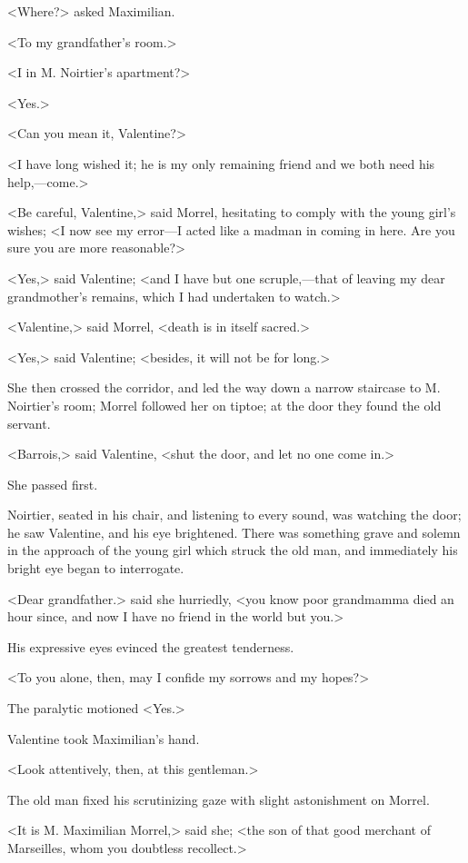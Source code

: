  <Where?> asked Maximilian. 

 <To my grandfather's room.> 

 <I in M. Noirtier's apartment?> 

 <Yes.> 

 <Can you mean it, Valentine?> 

 <I have long wished it; he is my only remaining friend and we both need his help,—come.> 

 <Be careful, Valentine,> said Morrel, hesitating to comply with the young girl's wishes; <I now see my error—I acted like a madman in coming in here. Are you sure you are more reasonable?> 

 <Yes,> said Valentine; <and I have but one scruple,—that of leaving my dear grandmother's remains, which I had undertaken to watch.> 

 <Valentine,> said Morrel, <death is in itself sacred.> 

 <Yes,> said Valentine; <besides, it will not be for long.> 

 She then crossed the corridor, and led the way down a narrow staircase to M. Noirtier's room; Morrel followed her on tiptoe; at the door they found the old servant. 

 <Barrois,> said Valentine, <shut the door, and let no one come in.> 

 She passed first. 

 Noirtier, seated in his chair, and listening to every sound, was watching the door; he saw Valentine, and his eye brightened. There was something grave and solemn in the approach of the young girl which struck the old man, and immediately his bright eye began to interrogate.  
 
 
 <Dear grandfather.> said she hurriedly, <you know poor grandmamma died an hour since, and now I have no friend in the world but you.> 

 His expressive eyes evinced the greatest tenderness. 

 <To you alone, then, may I confide my sorrows and my hopes?> 

 The paralytic motioned <Yes.> 

 Valentine took Maximilian's hand. 

 <Look attentively, then, at this gentleman.> 

 The old man fixed his scrutinizing gaze with slight astonishment on Morrel. 

 <It is M. Maximilian Morrel,> said she; <the son of that good merchant of Marseilles, whom you doubtless recollect.> 

